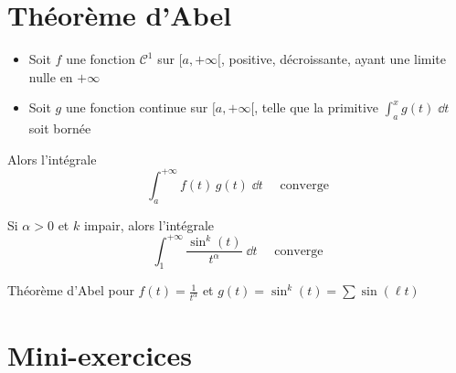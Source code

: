 \section*{Théorème d'Abel}

\begin{frame}
\begin{theoreme}[d'Abel]
\begin{itemize}
  \item Soit $f$ une fonction $\mathcal{C}^1$ sur $[a,+\infty[$, positive,
décroissante, ayant une limite nulle en $+\infty$
  \item Soit $g$ une fonction continue sur $[a,+\infty[$, telle que la
primitive $\int_a^x g(t)\;\dd t$ soit bornée
\end{itemize}
Alors l'intégrale
$$
\int_a^{+\infty} f(t)\,g(t)\;\dd t\quad\text{ converge}
$$  
\end{theoreme}

	\pause


\begin{exemple}
Si $\alpha>0$ et $k$ impair, alors l'intégrale 
$$
\int_1^{+\infty} \frac{\sin^k(t)}{t^\alpha}\;\dd t\quad\text{ converge}
$$

        \pause

Théorème d'Abel pour $f(t) = \frac{1}{t^\alpha}$ et $g(t)=\sin^k(t)= \sum \sin(\ell t)$
\end{exemple}
\end{frame}


 \section*{Mini-exercices}

